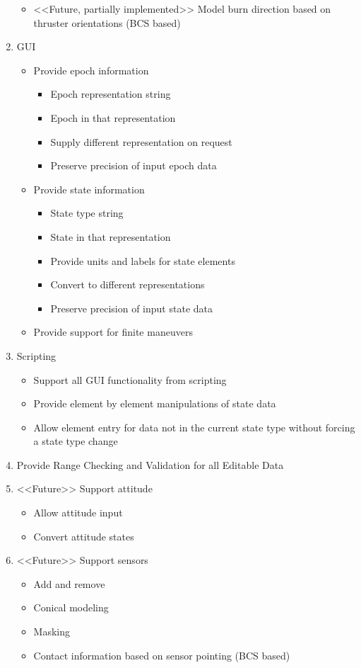 \begin{enumerate}
\begin{itemize}
\item <<Future, partially implemented>> Model burn direction based on thruster orientations (BCS
based)
\end{itemize}
\item GUI
\begin{itemize}
\item Provide epoch information
\begin{itemize}
\item Epoch representation string
\item Epoch in that representation
\item Supply different representation on request
\item Preserve precision of input epoch data
\end{itemize}
\item Provide state information
\begin{itemize}
\item State type string
\item State in that representation
\item Provide units and labels for state elements
\item Convert to different representations
\item Preserve precision of input state data
\end{itemize}
\item Provide support for finite maneuvers
\end{itemize}
\item Scripting
\begin{itemize}
\item Support all GUI functionality from scripting
\item Provide element by element manipulations of state data
\item Allow element entry for data not in the current state type without forcing a state type change
\end{itemize}
\item Provide Range Checking and Validation for all Editable Data
\item <<Future>> Support attitude
\begin{itemize}
\item Allow attitude input
\item Convert attitude states
\end{itemize}
\item  <<Future>> Support sensors
\begin{itemize}
\item Add and remove
\item Conical modeling
\item Masking
\item Contact information based on sensor pointing (BCS based)
\end{itemize}
\end{enumerate}


